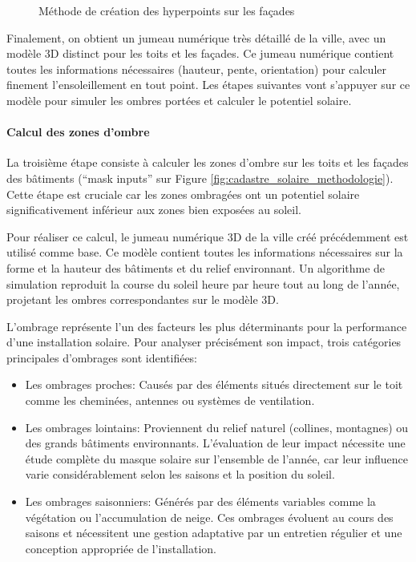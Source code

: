 {\begin{figure}[H]
    \caption{Méthode de création des hyperpoints sur les façades \cite{desthieux_solar_2018}}
    \label{fig:cadastre_solaire_hyperpoints}
\end{figure}
\par{Finalement, on obtient un jumeau numérique très détaillé de la ville, avec un modèle 3D distinct pour les toits et les façades. Ce jumeau numérique contient toutes les informations nécessaires (hauteur, pente, orientation) pour calculer finement l'ensoleillement en tout point. Les étapes suivantes vont s'appuyer sur ce modèle pour simuler les ombres portées et calculer le potentiel solaire.}

\paragraph{Calcul des zones d'ombre}
\par{La troisième étape consiste à calculer les zones d'ombre sur les toits et les façades des bâtiments (``mask inputs'' sur Figure \ref{fig:cadastre_solaire_methodologie}). Cette étape est cruciale car les zones ombragées ont un potentiel solaire significativement inférieur aux zones bien exposées au soleil.}
\par{Pour réaliser ce calcul, le jumeau numérique 3D de la ville créé précédemment est utilisé comme base. Ce modèle contient toutes les informations nécessaires sur la forme et la hauteur des bâtiments et du relief environnant. Un algorithme de simulation reproduit la course du soleil heure par heure tout au long de l'année, projetant les ombres correspondantes sur le modèle 3D.}
\par{L'ombrage représente l'un des facteurs les plus déterminants pour la performance d'une installation solaire. Pour analyser précisément son impact, trois catégories principales d'ombrages sont identifiées:}
\begin{itemize}
    \item Les ombrages proches: Causés par des éléments situés directement sur le toit comme les cheminées, antennes ou systèmes de ventilation.
    \item Les ombrages lointains: Proviennent du relief naturel (collines, montagnes) ou des grands bâtiments environnants. L'évaluation de leur impact nécessite une étude complète du masque solaire sur l'ensemble de l'année, car leur influence varie considérablement selon les saisons et la position du soleil.
    \item Les ombrages saisonniers: Générés par des éléments variables comme la végétation ou l'accumulation de neige. Ces ombrages évoluent au cours des saisons et nécessitent une gestion adaptative par un entretien régulier et une conception appropriée de l'installation.

\end{itemize}}
